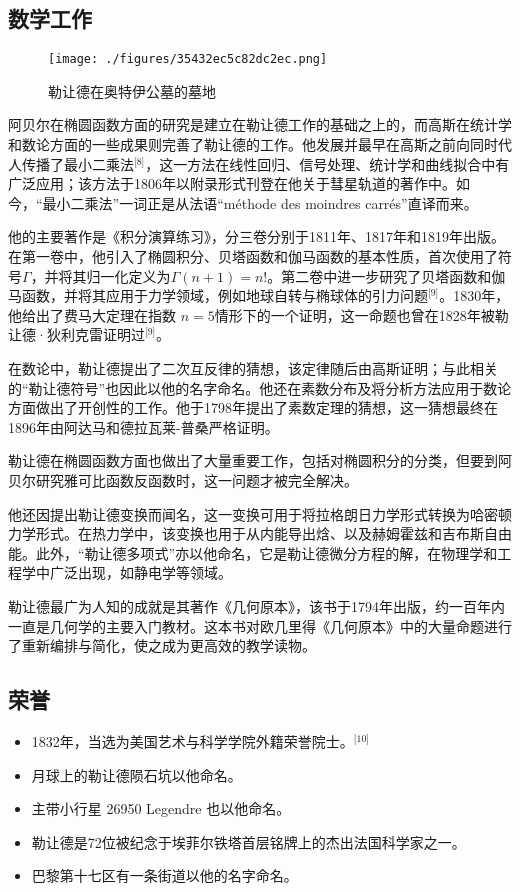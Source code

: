 \subsection{数学工作}
\begin{figure}[ht]
\centering
\texttt{[image: ./figures/35432ec5c82dc2ec.png]}
\caption{勒让德在奥特伊公墓的墓地} \label{fig_adla_3}
\end{figure}
阿贝尔在椭圆函数方面的研究是建立在勒让德工作的基础之上的，而高斯在统计学和数论方面的一些成果则完善了勒让德的工作。他发展并最早在高斯之前向同时代人传播了最小二乘法\(^\text{[8]}\)，这一方法在线性回归、信号处理、统计学和曲线拟合中有广泛应用；该方法于1806年以附录形式刊登在他关于彗星轨道的著作中。如今，“最小二乘法”一词正是从法语“méthode des moindres carrés”直译而来。

他的主要著作是《积分演算练习》，分三卷分别于1811年、1817年和1819年出版。在第一卷中，他引入了椭圆积分、贝塔函数和伽马函数的基本性质，首次使用了符号$\Gamma$，并将其归一化定义为$\Gamma(n+1) = n!$。第二卷中进一步研究了贝塔函数和伽马函数，并将其应用于力学领域，例如地球自转与椭球体的引力问题\(^\text{[9]}\)。1830年，他给出了费马大定理在指数 $n = 5$情形下的一个证明，这一命题也曾在1828年被勒让德·狄利克雷证明过\(^\text{[9]}\)。

在数论中，勒让德提出了二次互反律的猜想，该定律随后由高斯证明；与此相关的“勒让德符号”也因此以他的名字命名。他还在素数分布及将分析方法应用于数论方面做出了开创性的工作。他于1798年提出了素数定理的猜想，这一猜想最终在1896年由阿达马和德拉瓦莱-普桑严格证明。

勒让德在椭圆函数方面也做出了大量重要工作，包括对椭圆积分的分类，但要到阿贝尔研究雅可比函数反函数时，这一问题才被完全解决。

他还因提出勒让德变换而闻名，这一变换可用于将拉格朗日力学形式转换为哈密顿力学形式。在热力学中，该变换也用于从内能导出焓、以及赫姆霍兹和吉布斯自由能。此外，“勒让德多项式”亦以他命名，它是勒让德微分方程的解，在物理学和工程学中广泛出现，如静电学等领域。

勒让德最广为人知的成就是其著作《几何原本》，该书于1794年出版，约一百年内一直是几何学的主要入门教材。这本书对欧几里得《几何原本》中的大量命题进行了重新编排与简化，使之成为更高效的教学读物。
\subsection{荣誉}
\begin{itemize}
\item 1832年，当选为美国艺术与科学学院外籍荣誉院士。\(^\text{[10]}\)
\item 月球上的勒让德陨石坑以他命名。
\item 主带小行星 26950 Legendre 也以他命名。
\item 勒让德是72位被纪念于埃菲尔铁塔首层铭牌上的杰出法国科学家之一。
\item 巴黎第十七区有一条街道以他的名字命名。
\end{itemize}
